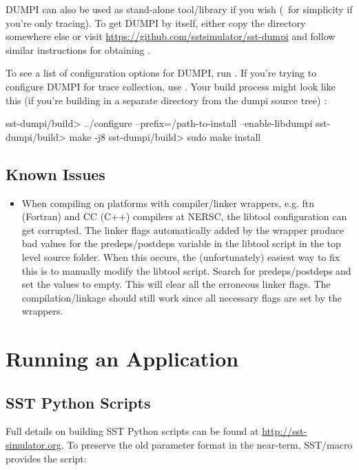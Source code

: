 DUMPI can also be used as stand-alone tool/library if you wish (\eg~for simplicity if you're only tracing). 
To get DUMPI by itself, either copy the  directory somewhere else or visit \url{https://github.com/sstsimulator/sst-dumpi} and follow similar instructions for obtaining \sstmacro.

To see a list of configuration options for DUMPI, run .  
If you're trying to configure DUMPI for trace collection, use .
Your build process might look like this (if you're building in a separate directory from the dumpi source tree) :

\begin{ShellCmd}
sst-dumpi/build> ../configure --prefix=/path-to-install --enable-libdumpi
sst-dumpi/build> make -j8
sst-dumpi/build> sudo make install
\end{ShellCmd}

\subsection{Known Issues}
\label{subsubsec:building:dumpi:issues}

\begin{itemize}
\item When compiling on platforms with compiler/linker wrappers, e.g. ftn (Fortran) and CC (C++) compilers 
at NERSC, the libtool configuration can get corrupted.  The linker flags automatically added by the 
wrapper produce bad values for the predeps/postdeps variable in the libtool script in the top 
level source folder.  When this occurs, the (unfortunately) easiest way to fix this is to manually modify
the libtool script.  Search for predeps/postdeps and set the values to empty.
This will clear all the erroneous linker flags.  The compilation/linkage should still work since 
all necessary flags are set by the wrappers. 
\end{itemize}

\section{Running an Application}
\subsection{SST Python Scripts}
Full details on building SST Python scripts can be found at \url{http://sst-simulator.org}.  To preserve the old parameter format in the near-term, SST/macro provides the  script:

